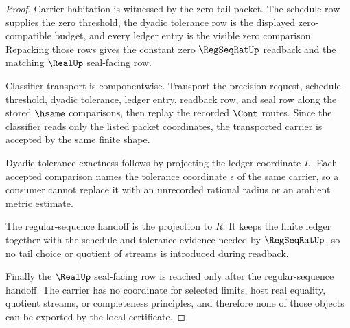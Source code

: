 \begin{proof}
Carrier habitation is witnessed by the zero-tail packet. The schedule row supplies the zero threshold, the dyadic tolerance row is the displayed zero-compatible budget, and every ledger entry is the visible zero comparison. Repacking those rows gives the constant zero $\RegSeqRatUp$ readback and the matching $\RealUp$ seal-facing row.

Classifier transport is componentwise. Transport the precision request, schedule threshold, dyadic tolerance, ledger entry, readback row, and seal row along the stored $\hsame$ comparisons, then replay the recorded $\Cont$ routes. Since the classifier reads only the listed packet coordinates, the transported carrier is accepted by the same finite shape.

Dyadic tolerance exactness follows by projecting the ledger coordinate $L$. Each accepted comparison names the tolerance coordinate $\epsilon$ of the same carrier, so a consumer cannot replace it with an unrecorded rational radius or an ambient metric estimate.

The regular-sequence handoff is the projection to $R$. It keeps the finite ledger together with the schedule and tolerance evidence needed by $\RegSeqRatUp$, so no tail choice or quotient of streams is introduced during readback.

Finally the $\RealUp$ seal-facing row is reached only after the regular-sequence handoff. The carrier has no coordinate for selected limits, host real equality, quotient streams, or completeness principles, and therefore none of those objects can be exported by the local certificate.
\end{proof}


